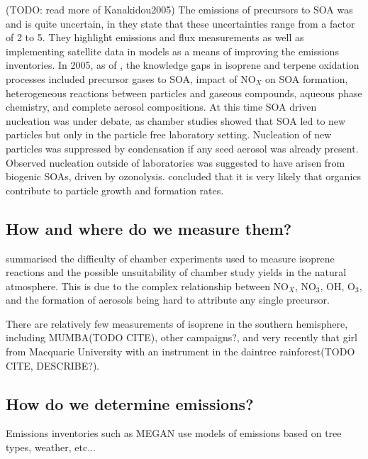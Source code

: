       (TODO: read more of Kanakidou2005)
      The emissions of precursors to SOA was and is quite uncertain, in \cite{Kanakidou2005} they state that these uncertainties range from a factor of 2 to 5.
      They highlight emissions and flux measurements as well as implementing satellite data in models as a means of improving the emissions inventories.
      In 2005, as of \cite{Kanakidou2005}, the knowledge gaps in isoprene and terpene oxidation processes included precursor gases to SOA, impact of NO$_X$ on SOA formation, heterogeneous reactions between particles and gaseous compounds, aqueous phase chemistry, and complete aerosol compositions.
      At this time SOA driven nucleation was under debate, as chamber studies showed that SOA led to new particles but only in the particle free laboratory setting. 
      Nucleation of new particles was suppressed by condensation if any seed aerosol was already present.
      Observed nucleation outside of laboratories was suggested to have arisen from biogenic SOAs, driven by ozonolysis.
      \cite{Kanakidou2005} concluded that it is very likely that organics contribute to particle growth and formation rates.
    
  \subsection{How and where do we measure them?}

    
    \cite{Kanakidou2005} summarised the difficulty of chamber experiments used to measure isoprene reactions and the possible unsuitability of chamber study yields in the natural atmosphere.
    This is due to the complex relationship between NO$_X$, NO$_3$, OH, O$_3$, and the formation of aerosols being hard to attribute any single precursor.
    
    
    
    There are relatively few measurements of isoprene in the southern hemisphere, including MUMBA(TODO CITE), other campaigns?, and very recently that girl from Macquarie University with an instrument in the daintree rainforest(TODO CITE, DESCRIBE?).
    
  
  \subsection{How do we determine emissions?}
    Emissions inventories such as MEGAN use models of emissions based on tree types, weather, etc... 
    
